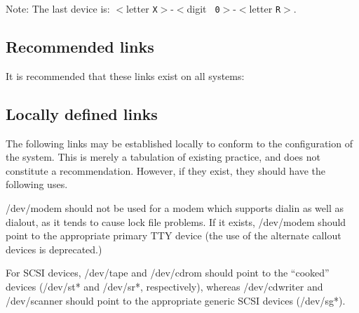 \noindent
Note: The last device is: $<$letter {\tt X}$>$-$<$digit {\tt
0}$>$-$<$letter {\tt R}$>$.

\subsection{Recommended links}

It is recommended that these links exist on all systems:

\begin{nodelist}
\end{nodelist}

\subsection{Locally defined links}

The following links may be established locally to conform to the
configuration of the system.  This is merely a tabulation of existing
practice, and does not constitute a recommendation.  However, if they
exist, they should have the following uses.

\begin{nodelist}
\end{nodelist}

\noindent
{\file /dev/modem} should not be used for a modem which supports
dialin as well as dialout, as it tends to cause lock file problems.
If it exists, {\file /dev/modem} should point to the appropriate
primary TTY device (the use of the alternate callout devices is
deprecated.)

For SCSI devices, {\file /dev/tape} and {\file /dev/cdrom} should
point to the ``cooked'' devices ({\file /dev/st*} and {\file
/dev/sr*}, respectively), whereas {\file /dev/cdwriter} and {\file
/dev/scanner} should point to the appropriate generic SCSI devices
({\file /dev/sg*}).

